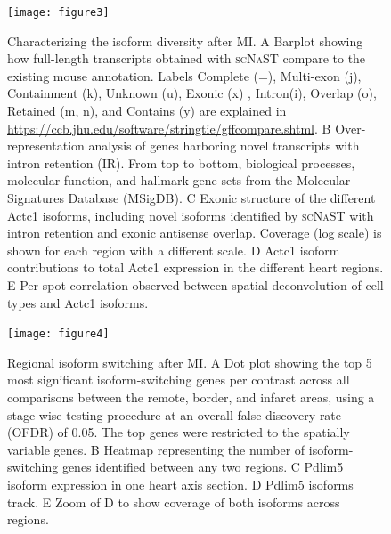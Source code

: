 \documentclass[utf8]{FrontiersinHarvard} %
\newcommand{\scnast}{\textsc{scNaST}\xspace}
\begin{document}
\begin{figure}[h!]
\begin{center}
\texttt{[image: figure3]}
\end{center}
\caption{Characterizing the isoform diversity after MI. A Barplot showing how full-length transcripts obtained with \scnast compare to the existing mouse annotation. Labels Complete (=), Multi-exon (j), Containment (k), Unknown (u), Exonic (x) , Intron(i), Overlap (o), Retained (m, n), and Contains (y) are explained in \url{https://ccb.jhu.edu/software/stringtie/gffcompare.shtml}. B Over-representation analysis of genes harboring novel transcripts with intron retention (IR). From top to bottom, biological processes, molecular function, and hallmark gene sets from the Molecular Signatures Database (MSigDB). C Exonic structure of the different Actc1 isoforms, including novel isoforms identified by \scnast with intron retention and exonic antisense overlap. Coverage (log scale) is shown for each region with a different scale. D Actc1 isoform contributions to total Actc1 expression in the different heart regions. E Per spot correlation observed between spatial deconvolution of cell types and Actc1 isoforms. }\label{fig:3}
\end{figure}


\begin{figure}[h!]
\begin{center}
\texttt{[image: figure4]}
\end{center}
\caption{Regional isoform switching after MI. A Dot plot showing the top 5 most significant isoform-switching genes per contrast across all comparisons between the remote, border, and infarct areas, using a stage-wise testing procedure at an overall false discovery rate (OFDR) of 0.05. The top genes were restricted to the spatially variable genes. B Heatmap representing the number of isoform-switching genes identified between any two regions. C Pdlim5 isoform expression in one heart axis section. D Pdlim5 isoforms track. E Zoom of D to show coverage of both isoforms across regions.}\label{fig:4}
\end{figure}
\end{document}

